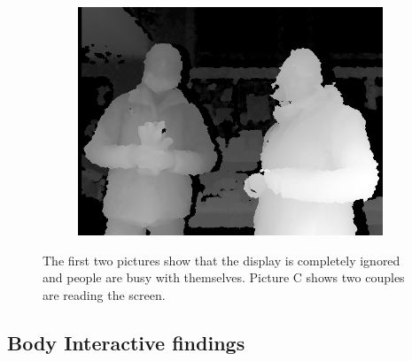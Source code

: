 \begin{figure}[H]
\begin{subfigure}[H]{0.3\textwidth}
        \centering
        \includegraphics[width=\textwidth]{Figures/8/non_inter_findings/effects/reading}
        \caption{}
        \label{fig:non-reading}
    \end{subfigure}
    \caption{The first two pictures show that the display is completely ignored and people are busy with themselves. Picture C shows two couples are reading the screen.}
    \label{fig:three-non-behavior}
\end{figure}

\newpage
\subsection{Body Interactive findings}


